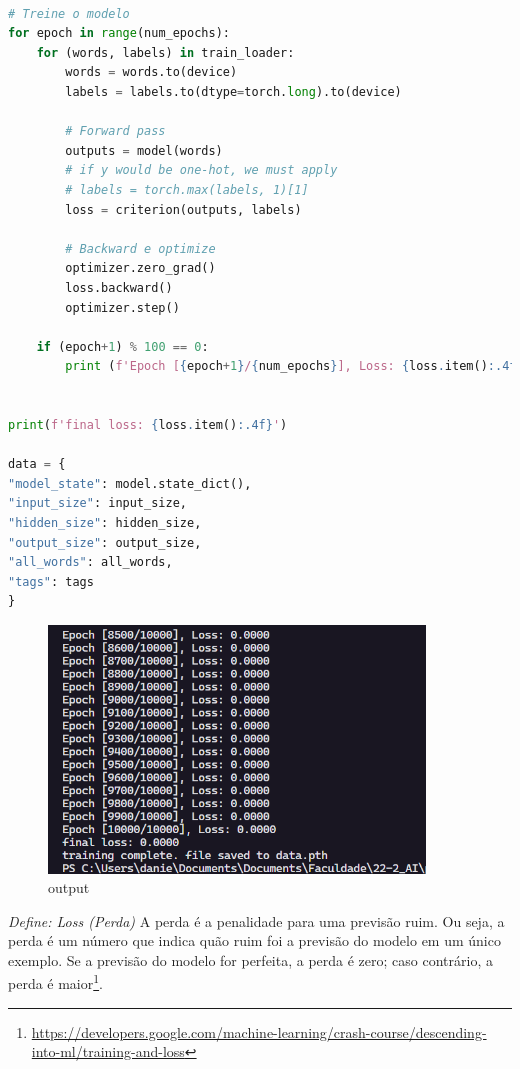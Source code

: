 \begin{lstlisting}[language=Python, caption=Treinando o Modelo]

# Treine o modelo
for epoch in range(num_epochs):
    for (words, labels) in train_loader:
        words = words.to(device)
        labels = labels.to(dtype=torch.long).to(device)

        # Forward pass
        outputs = model(words)
        # if y would be one-hot, we must apply
        # labels = torch.max(labels, 1)[1]
        loss = criterion(outputs, labels)

        # Backward e optimize
        optimizer.zero_grad()
        loss.backward()
        optimizer.step()

    if (epoch+1) % 100 == 0:
        print (f'Epoch [{epoch+1}/{num_epochs}], Loss: {loss.item():.4f}')


print(f'final loss: {loss.item():.4f}')

data = {
"model_state": model.state_dict(),
"input_size": input_size,
"hidden_size": hidden_size,
"output_size": output_size,
"all_words": all_words,
"tags": tags
}


\end{lstlisting}

\begin{figure}[H]
   \begin{center}
      \includegraphics[width=10cm]{img/treinando.png}
      \caption{output} \label{tmode}
   \end{center}
\end{figure}

\textit{Define: Loss (Perda)} A perda é a penalidade para uma previsão ruim. Ou seja, a perda é um número que indica quão ruim foi a previsão do modelo em um único exemplo. Se a previsão do modelo for perfeita, a perda é zero; caso contrário, a perda é maior\footnote{\url{https://developers.google.com/machine-learning/crash-course/descending-into-ml/training-and-loss}}.


